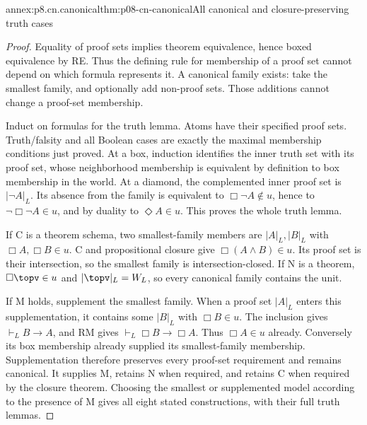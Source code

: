 \begin{annexitem}{annex:p8.cn.canonical}{thm:p08-cn-canonical}{All canonical and closure-preserving truth cases}
\begin{proof}
Equality of proof sets implies theorem equivalence, hence boxed
equivalence by RE. Thus the defining rule for membership of a
proof set cannot depend on which formula represents it. A
canonical family exists: take the smallest family, and optionally
add non-proof sets. Those additions cannot change a proof-set
membership.

Induct on formulas for the truth lemma. Atoms have their specified
proof sets. Truth/falsity and all Boolean cases are exactly the
maximal membership conditions just proved. At a box, induction
identifies the inner truth set with its proof set, whose neighborhood
membership is equivalent by definition to box membership in the
world. At a diamond, the complemented inner proof set is
\(|\neg A|_L\). Its absence from the family is equivalent
to \(\Box\neg A\notin u\), hence to
\(\neg\Box\neg A\in u\), and by duality to
\(\Diamond A\in u\). This proves the whole truth lemma.

If C is a theorem schema, two smallest-family members are
\(|A|_L,|B|_L\) with \(\Box A,\Box B\in u\).
C and propositional closure give \(\Box(A\land B)\in u\).
Its proof set is their intersection, so the smallest family is
intersection-closed. If N is a theorem, \(\Box\topv\in u\)
and \(|\topv|_L=W_L\), so every canonical family contains
the unit.

If M holds, supplement the smallest family. When a proof set
\(|A|_L\) enters this supplementation, it contains some
\(|B|_L\) with \(\Box B\in u\). The inclusion gives
\(\vdash_L B\to A\), and RM gives
\(\vdash_L\Box B\to\Box A\). Thus \(\Box A\in u\)
already. Conversely its box membership already supplied its
smallest-family membership. Supplementation therefore preserves
every proof-set requirement and remains canonical. It supplies
M, retains N when required, and retains C when required by the
closure theorem. Choosing the smallest or supplemented model
according to the presence of M gives all eight stated constructions,
with their full truth lemmas.
\end{proof}
\end{annexitem}

